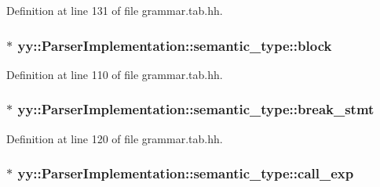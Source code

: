 Definition at line 131 of file grammar.tab.hh.

\hypertarget{unionyy_1_1_parser_implementation_1_1semantic__type_a6e0cbf07910f7cd01e8f8a720c09bdfa}{
\subsubsection[{block}]{$\ast$ {\bf yy::ParserImplementation::semantic\_\-type::block}}}
\label{unionyy_1_1_parser_implementation_1_1semantic__type_a6e0cbf07910f7cd01e8f8a720c09bdfa}


Definition at line 110 of file grammar.tab.hh.

\hypertarget{unionyy_1_1_parser_implementation_1_1semantic__type_af2da2292ba7eedaec10069e227504bc3}{
\subsubsection[{break\_\-stmt}]{$\ast$ {\bf yy::ParserImplementation::semantic\_\-type::break\_\-stmt}}}
\label{unionyy_1_1_parser_implementation_1_1semantic__type_af2da2292ba7eedaec10069e227504bc3}


Definition at line 120 of file grammar.tab.hh.

\hypertarget{unionyy_1_1_parser_implementation_1_1semantic__type_a43efd29a7db8ccbb6c94ae7a7c8116f3}{
\subsubsection[{call\_\-exp}]{$\ast$ {\bf yy::ParserImplementation::semantic\_\-type::call\_\-exp}}}
\label{unionyy_1_1_parser_implementation_1_1semantic__type_a43efd29a7db8ccbb6c94ae7a7c8116f3}


